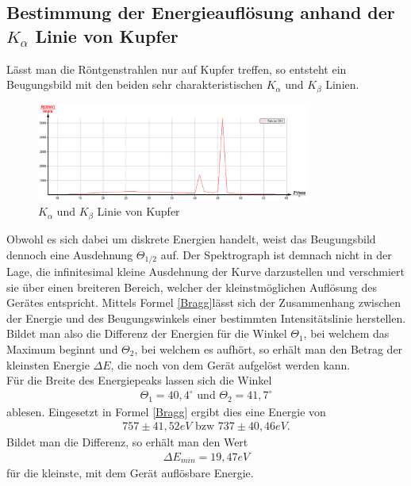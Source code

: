 \subsection{Bestimmung der Energieauflösung anhand der $K_\alpha$ Linie von Kupfer}
Lässt man die Röntgenstrahlen nur auf Kupfer treffen, so entsteht ein Beugungsbild mit den beiden sehr charakteristischen $K_\alpha$ und $K_\beta$ Linien. 
\begin{figure}[htbp]
\includegraphics[width=0.8\textwidth] {pics/kupfer_ab.png}
\centering
\caption{$K_\alpha \text{ und } K_\beta$ Linie von Kupfer}
\label{Aufbau}
\end{figure}

Obwohl es sich dabei um diskrete Energien handelt, weist das Beugungsbild dennoch eine Ausdehnung $\Theta_{1/2}$ auf. Der Spektrograph ist demnach nicht in der Lage, die infinitesimal kleine Ausdehnung der Kurve darzustellen und verschmiert sie über einen breiteren Bereich, welcher der kleinstmöglichen Auflösung des Gerätes entspricht.
Mittels Formel \ref{Bragg}lässt sich der Zusammenhang zwischen der Energie und des Beugungswinkels einer bestimmten Intensitätslinie herstellen.  
Bildet man also die Differenz der Energien für die Winkel $\Theta_1$, bei welchem das Maximum beginnt und $\Theta_2$, bei welchem es aufhört, so erhält man den Betrag der kleinsten Energie $\Delta E$, die noch von dem Gerät aufgelöst werden kann.\\
Für die Breite des Energiepeaks lassen sich die Winkel 
\begin{align*}
\Theta_1 = 40,4^\circ \text{ und } \Theta_2 = 41,7^\circ
\end{align*}
 ablesen. Eingesetzt in Formel \ref{Bragg} ergibt dies eine Energie von 
\begin{align*}
	757\pm41,52eV \text{ bzw } 737\pm40,46eV.
\end{align*}
Bildet man die Differenz, so erhält man den Wert 
\begin{align*}
\Delta E_{min} = 19,47eV
\end{align*}
für die kleinste, mit dem Gerät auflösbare Energie.
 
